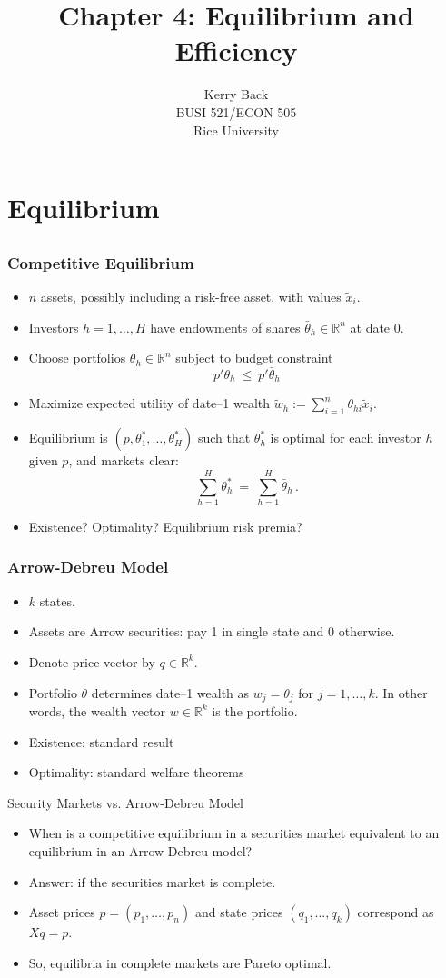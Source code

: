 \documentclass[10pt]{beamer}
\title{Chapter 4: Equilibrium and Efficiency}
\date{}
\author{Kerry Back\\ 
BUSI 521/ECON 505\\
Rice University}
\newcommand{\bi}{\begin{itemize}}
\newcommand{\ei}{\end{itemize}}
\newcommand{\im}{\item}
\newcommand{\myreal}{\ensuremath{\mathbb{R}}}
\newcommand{\bfr}{\begin{frame}}
\newcommand{\tw}{\tilde{w}}
\newcommand{\tx}{\tilde{x}}
\begin{document}

\begin{frame}[plain]
    \titlepage
  \end{frame}
  
  
  \section{Equilibrium}\subsection{}
  \bfr\frametitle{Competitive Equilibrium}
  \bi 
  \im $n$ assets, possibly including a risk-free asset, with values $\tx_i$.  
  \im Investors $h=1, \ldots, H$ have endowments of shares $\bar{\theta}_h \in \myreal^n$ at date 0.
  \im Choose portfolios $\theta_h \in \myreal^n$ subject to budget constraint
  $$p'\theta_h \ \le \ p'\bar{\theta}_h$$
  \im Maximize expected utility of date--1 wealth $\tw_h :=\sum_{i=1}^n \theta_{hi}\tx_i$.   
  \im Equilibrium is $(p,\theta^*_1, \ldots, \theta^*_H)$ such that $\theta^*_h$ is optimal for each investor $h$ given $p$, and markets clear:
  $$\sum_{h=1}^H \theta^*_h \ = \ \sum_{h=1}^H \bar{\theta}_h\,.$$
  \im  Existence?
  Optimality?  
  Equilibrium risk premia?
  \ei
  \end{frame}
  
  \bfr\frametitle{Arrow-Debreu Model}
  \bi 
  \im 
  $k$ states.  
  \im Assets are Arrow securities: pay 1 in single state and 0 otherwise.  
  \im Denote price vector by $q \in \myreal^k$.     
  \im Portfolio $\theta$ determines date--1 wealth as $w_j = \theta_j$ for $j=1, \ldots, k$.  In other words, the wealth vector $w \in \myreal^k$ is the portfolio.
  \im Existence: standard result
  \im Optimality: standard welfare theorems
  \ei 
  \end{frame}
  
  \begin{frame}{Security Markets vs. Arrow-Debreu Model}
    \bi 
    \im 
  When is a competitive equilibrium in a securities market equivalent to an equilibrium in an Arrow-Debreu model?
  \im   Answer: if the securities market is complete.
  \im Asset prices $p =(p_1, \ldots, p_n)$ and state prices $(q_1, \ldots, q_k)$ correspond as $Xq=p$.
  \im  So, equilibria in complete markets are Pareto optimal.
  \ei
  \end{frame}
  
\end{document}
